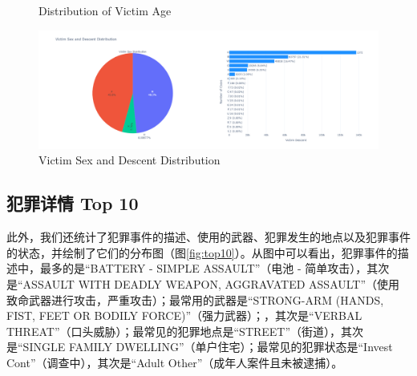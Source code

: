 \documentclass{article}
\begin{document}
\begin{figure}[htbp]
    \centering

    \hspace{0.5cm}

    \caption{Distribution of Victim Age}
    \label{fig:age}
\end{figure}

\begin{figure}[H]
    \centering
    \includegraphics[width=1\textwidth]{../pic/sex_and_descent.png}
    \caption{Victim Sex and Descent Distribution}
    \label{fig:sex_and_descent}
\end{figure}

\subsection{犯罪详情 Top 10}
此外，我们还统计了犯罪事件的描述、使用的武器、犯罪发生的地点以及犯罪事件的状态，并绘制了它们的分布图（图\ref{fig:top10}）。从图中可以看出，犯罪事件的描述中，最多的是“BATTERY - SIMPLE ASSAULT”（电池 - 简单攻击），其次是“ASSAULT WITH DEADLY WEAPON, AGGRAVATED ASSAULT”（使用致命武器进行攻击，严重攻击）；最常用的武器是“STRONG-ARM (HANDS, FIST, FEET OR BODILY FORCE)”（强力武器）；，其次是“VERBAL THREAT”（口头威胁）；最常见的犯罪地点是“STREET”（街道），其次是“SINGLE FAMILY DWELLING”（单户住宅）；最常见的犯罪状态是“Invest Cont”（调查中），其次是“Adult Other”（成年人案件且未被逮捕）。
\end{document}
